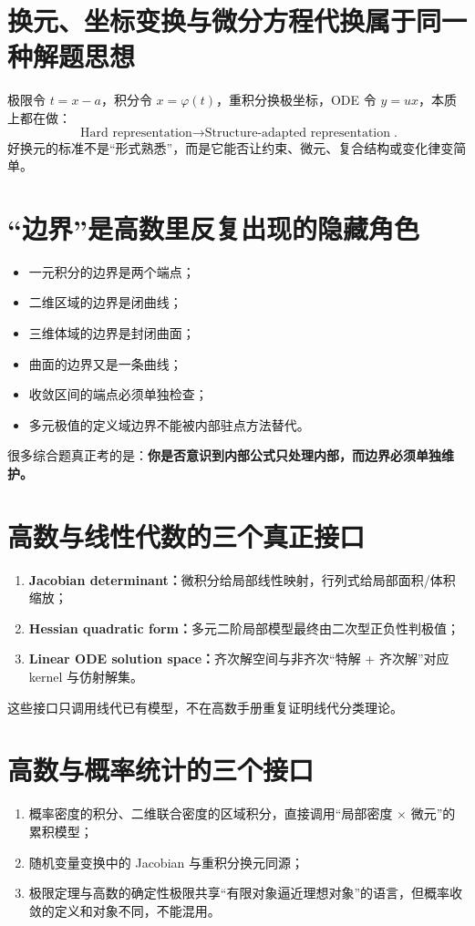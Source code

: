 \documentclass[11pt,a4paper,openany]{ctexbook}
\newcommand{\key}[1]{\textbf{\color{deep}#1}}
\begin{document}
\section{换元、坐标变换与微分方程代换属于同一种解题思想}
极限令 $t=x-a$，积分令 $x=\varphi(t)$，重积分换极坐标，ODE 令 $y=ux$，本质上都在做：
\[
\boxed{\text{Hard representation}\to\text{Structure-adapted representation}}.
\]
好换元的标准不是“形式熟悉”，而是它能否让约束、微元、复合结构或变化律变简单。

\section{“边界”是高数里反复出现的隐藏角色}
\begin{itemize}
  \item 一元积分的边界是两个端点；
  \item 二维区域的边界是闭曲线；
  \item 三维体域的边界是封闭曲面；
  \item 曲面的边界又是一条曲线；
  \item 收敛区间的端点必须单独检查；
  \item 多元极值的定义域边界不能被内部驻点方法替代。
\end{itemize}
很多综合题真正考的是：\key{你是否意识到内部公式只处理内部，而边界必须单独维护。}

\section{高数与线性代数的三个真正接口}
\begin{enumerate}
  \item \key{Jacobian determinant：}微积分给局部线性映射，行列式给局部面积/体积缩放；
  \item \key{Hessian quadratic form：}多元二阶局部模型最终由二次型正负性判极值；
  \item \key{Linear ODE solution space：}齐次解空间与非齐次“特解 + 齐次解”对应 kernel 与仿射解集。
\end{enumerate}
这些接口只调用线代已有模型，不在高数手册重复证明线代分类理论。

\section{高数与概率统计的三个接口}
\begin{enumerate}
  \item 概率密度的积分、二维联合密度的区域积分，直接调用“局部密度 $\times$ 微元”的累积模型；
  \item 随机变量变换中的 Jacobian 与重积分换元同源；
  \item 极限定理与高数的确定性极限共享“有限对象逼近理想对象”的语言，但概率收敛的定义和对象不同，不能混用。
\end{enumerate}
\end{document}
